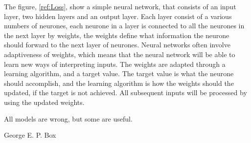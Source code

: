 The figure, \autoref{ref:Loss}, show a simple neural network, that consists of an input layer, two hidden layers and an output layer. Each layer consist of a various numbers of neurones, each neurone in a layer is connected to all the neurones in the next layer by weights, the weights define what information the neurone should forward to the next layer of neurones. Neural networks often involve adaptiveness of weights, which means that the neural network will be able to learn new ways of interpreting inputs. The weights are adapted through a learning algorithm, and a target value. The target value is what the neurone should accomplish, and the learning algorithm is how the weights should the updated, if the target is not achieved. All subsequent inputs will be processed by using the updated weights.
\newpage
\epigraph{All models are wrong, but some are useful.}{George E. P. Box}

